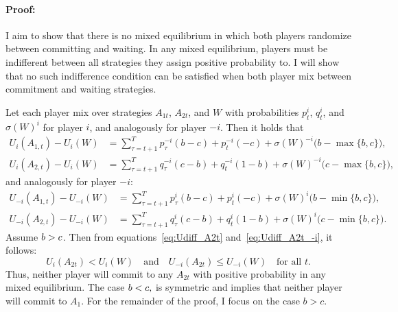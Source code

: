 \documentclass[main.tex]{subfiles}
\begin{document}
\paragraph{Proof:}
I aim to show that there is no mixed equilibrium in which both players randomize between committing and waiting. 
In any mixed equilibrium, players must be indifferent between all strategies they assign positive probability to.
I will show that no such indifference condition can be satisfied when both player mix between commitment and waiting strategies.

Let each player mix over strategies $A_{1t}$, $A_{2t}$, and $W$ with probabilities $p_t^i$, $q_t^i$, and $\sigma(W)^i$ for player $i$, and analogously for player $-i$. Then it holds that
\begin{align}
    U_i(A_{1, t}) - U_i(W) 
    &= \sum_{\tau = t+1}^T p_{\tau}^{-i}(b-c) + p_{t}^{-i}(-c) + \sigma(W)^{-i} \bigl(b - \max\{b,c\}\bigr),
    \label{eq:Udiff_A1t} \\[6pt]
    U_i(A_{2, t}) - U_i(W) 
    &= \sum_{\tau = t+1}^T q_{\tau}^{-i}(c-b) + q_{t}^{-i}(1-b) + \sigma(W)^{-i} \bigl(c - \max\{b,c\}\bigr),
    \label{eq:Udiff_A2t}
\end{align}
and analogously for player $-i$:
\begin{align}
    U_{-i}(A_{1, t}) - U_{-i}(W) 
    &= \sum_{\tau = t+1}^T p_{\tau}^{i}(b-c) + p_{t}^{i}(-c) + \sigma(W)^{i} \bigl(b - \min\{b,c\}\bigr),
    \label{eq:Udiff_A1t_-i} \\[6pt]
    U_{-i}(A_{2, t}) - U_{-i}(W) 
    &= \sum_{\tau = t+1}^T q_{\tau}^{i}(c-b) + q_{t}^{i}(1-b) + \sigma(W)^{i} \bigl(c - \min\{b,c\}\bigr).
    \label{eq:Udiff_A2t_-i}
\end{align}
Assume $b > c$. Then from equations~\eqref{eq:Udiff_A2t} and~\eqref{eq:Udiff_A2t_-i}, it follows:
\[
U_i(A_{2t}) < U_i(W) \quad \text{and} \quad U_{-i}(A_{2t}) \leq U_{-i}(W) \quad \text{for all } t.
\]
Thus, neither player will commit to any $A_{2t}$ with positive probability in any mixed equilibrium. The case $b < c,$ is symmetric and implies that neither player will commit to $A_1$. For the remainder of the proof, I focus on the case $b > c$.
\end{document}
